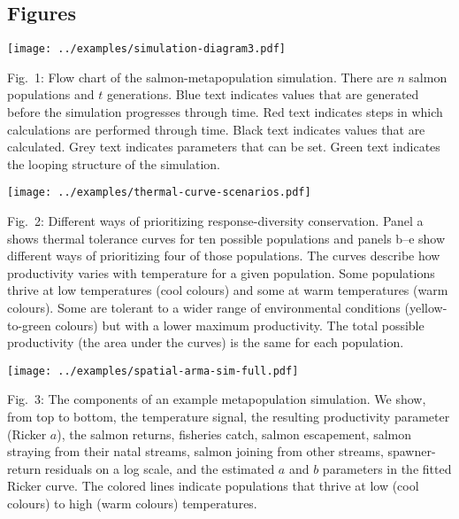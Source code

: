 \documentclass[11pt]{article}
\begin{document}
\begin{spacing}{1.4}

\clearpage

\section{Figures}

\begin{center}
\texttt{[image: ../examples/simulation-diagram3.pdf]}
\end{center}
Fig.\ 1: Flow chart of the salmon-metapopulation simulation. There are $n$ salmon populations and $t$ generations. Blue text indicates values that are generated before the simulation progresses through time. Red text indicates steps in which calculations are performed through time. Black text indicates values that are calculated. Grey text indicates parameters that can be set. Green text indicates the looping structure of the simulation.

\clearpage

\begin{center}
\texttt{[image: ../examples/thermal-curve-scenarios.pdf]}
\end{center}
Fig.\ 2: Different ways of prioritizing response-diversity conservation. Panel a shows thermal tolerance curves for ten possible populations and panels b--e show different ways of prioritizing four of those populations. The curves describe how productivity varies with temperature for a given population. Some populations thrive at low temperatures (cool colours) and some at warm temperatures (warm colours). Some are tolerant to a wider range of environmental conditions (yellow-to-green colours) but with a lower maximum productivity. The total possible productivity (the area under the curves) is the same for each population.

\clearpage

\begin{center}
\texttt{[image: ../examples/spatial-arma-sim-full.pdf]}
\end{center}
Fig.\ 3: The components of an example metapopulation simulation. We show, from top to bottom, the temperature signal, the resulting productivity parameter (Ricker $a$), the salmon returns, fisheries catch, salmon escapement, salmon straying from their natal streams, salmon joining from other streams, spawner-return residuals on a log scale, and the estimated $a$ and $b$ parameters in the fitted Ricker curve. The colored lines indicate populations that thrive at low (cool colours) to high (warm colours) temperatures.


\end{spacing}
\end{document}
